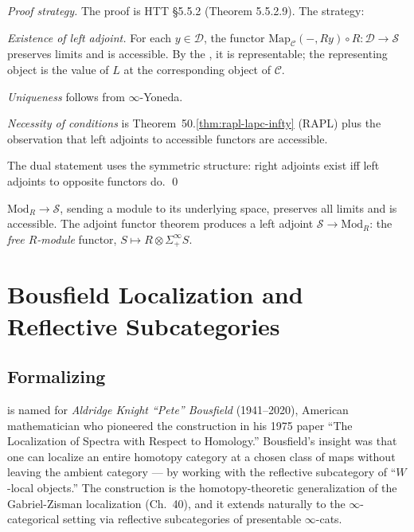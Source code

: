 \begin{proof}[Proof strategy]
The proof is HTT §5.5.2 (Theorem 5.5.2.9). The strategy:

\emph{Existence of left adjoint.} For each $y \in \mathcal{D}$, the
functor $\mathrm{Map}_\mathcal{C}(-, R y) \circ R : \mathcal{D} \to \mathcal{S}$
preserves limits and is accessible. By the , it is representable; the representing
object is the value of $L$ at the corresponding object of $\mathcal{C}$.

\emph{Uniqueness} follows from $\infty$-Yoneda.

\emph{Necessity of conditions} is Theorem~50.\ref{thm:rapl-lapc-infty}
(RAPL) plus the observation that left adjoints to accessible functors
are accessible.

The dual statement uses the symmetric structure: right adjoints exist
iff left adjoints to opposite functors do. \qed
\end{proof}

\begin{example_thm}
\label{ex:free-construction}
$\mathrm{Mod}_R \to \mathcal{S}$, sending a module to its underlying space,
preserves all limits and is accessible. The adjoint functor theorem
produces a left adjoint $\mathcal{S} \to \mathrm{Mod}_R$: the \emph{free
$R$-module} functor, $S \mapsto R \otimes \Sigma^\infty_+ S$.
\end{example_thm}


\section{Bousfield Localization and Reflective Subcategories}
\label{sec:bousfield}

\subsection{Formalizing}

\begin{nameorigin}
 is named for \emph{Aldridge Knight ``Pete''
Bousfield} (1941--2020), American mathematician who pioneered the
construction in his 1975 paper ``The Localization of Spectra with
Respect to Homology.'' Bousfield's insight was that one can localize an
entire homotopy category at a chosen class of maps without leaving the
ambient category — by working with the reflective subcategory of
``$W$-local objects.'' The construction is the homotopy-theoretic
generalization of the Gabriel-Zisman localization (Ch.~40), and it
extends naturally to the $\infty$-categorical setting via reflective
subcategories of presentable $\infty$-cats.
\end{nameorigin}


